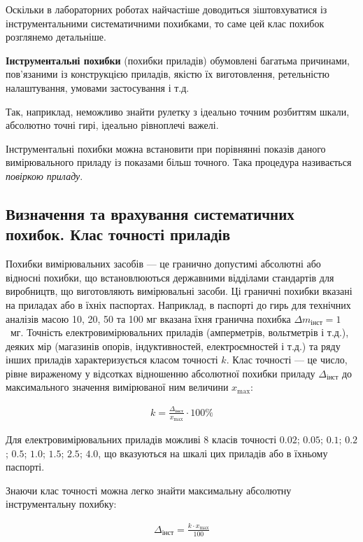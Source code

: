 \documentclass{LabBook}
\begin{document}
  Оскільки в лабораторних роботах найчастіше доводиться зіштовхуватися із інструментальними систематичними похибками, то саме цей клас похибок розглянемо детальніше.

  \textbf{Інструментальні похибки} (похибки приладів) обумовлені багатьма причинами, пов’язаними із конструкцією приладів, якістю їх виготовлення, ретельністю налаштування, умовами застосування і т.д.

  Так, наприклад, неможливо знайти рулетку з ідеально точним розбиттям шкали, абсолютно точні гирі, ідеально рівноплечі важелі.

  Інструментальні похибки можна встановити при порівнянні показів даного вимірювального приладу із показами більш точного. Така процедура називається \emph{повіркою приладу}.

  \subsection{Визначення та врахування систематичних похибок. Клас точності приладів}


    Похибки вимірювальних засобів --- це гранично допустимі абсолютні або відносні похибки, що встановлюються державними відділами стандартів для виробництв, що виготовляють вимірювальні засоби. Ці граничні похибки вказані на приладах або в їхніх паспортах. Наприклад, в паспорті до гирь для технічних аналізів масою 10, 20, 50 та 100 мг вказана їхня гранична похибка $\Delta m_\text{інст} = 1$~мг.
    Точність електровимірювальних приладів (амперметрів, вольтметрів і т.д.), деяких мір (магазинів опорів, індуктивностей, електроємностей і т.д.) та ряду інших приладів характеризується класом точності $k$.
    Клас точності --- це число, рівне вираженому у відсотках відношенню абсолютної похибки приладу $\Delta _\text{інст}$ до  максимального значення вимірюваної ним величини $x_{\max}$:

    \begin{align*}
      k= \frac{\Delta_\text{інст}}{x_{\max}} \cdot 100\%
    \end{align*}



    Для електровимірювальних приладів  можливі 8 класів точності $ 0.02 $; $ 0.05 $; $ 0.1 $; $ 0.2 $; $ 0.5 $; $ 1.0 $; $ 1.5 $; $ 2.5 $; $ 4.0 $, що  вказуються  на  шкалі цих приладів або в їхньому паспорті.

    Знаючи клас точності можна легко знайти максимальну абсолютну інструментальну похибку:

    \begin{align*}
      \Delta_\text{інст} =  \frac{k \cdot x_{\max}}{100}
    \end{align*}
\end{document}
